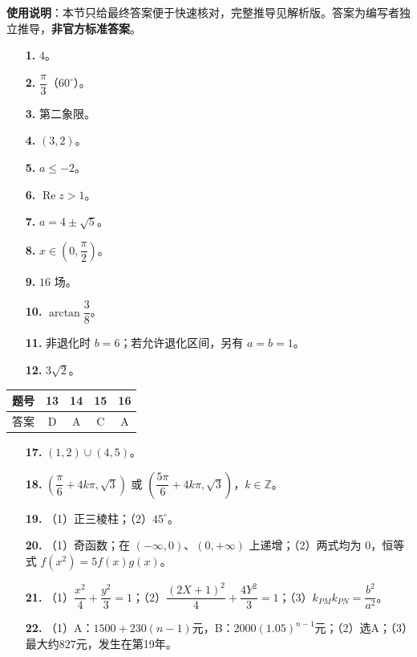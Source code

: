 
\begin{gknotice}
\textbf{使用说明}：本节只给最终答案便于快速核对，完整推导见解析版。答案为编写者独立推导，\textbf{非官方标准答案}。
\end{gknotice}

\begin{itemize}[leftmargin=2.6em]
  \item[\textbf{1.}] $4$。
  \item[\textbf{2.}] $\dfrac{\pi}{3}$（$60^\circ$）。
  \item[\textbf{3.}] 第二象限。
  \item[\textbf{4.}] $(3,2)$。
  \item[\textbf{5.}] $a\le -2$。
  \item[\textbf{6.}] $\operatorname{Re}z>1$。
  \item[\textbf{7.}] $a=4\pm\sqrt5$。
  \item[\textbf{8.}] $x\in(0,\dfrac{\pi}{2})$。
  \item[\textbf{9.}] $16$ 场。
  \item[\textbf{10.}] $\arctan\dfrac{3}{8}$。
  \item[\textbf{11.}] 非退化时 $b=6$；若允许退化区间，另有 $a=b=1$。
  \item[\textbf{12.}] $3\sqrt2$。
\end{itemize}

\begin{center}\begin{tabular}{ccccc}
\toprule
题号 & 13 & 14 & 15 & 16 \\
\midrule
答案 & D & A & C & A \\
\bottomrule
\end{tabular}\end{center}

\begin{itemize}[leftmargin=2.6em]
  \item[\textbf{17.}] $(1,2)\cup(4,5)$。
  \item[\textbf{18.}] $\left(\dfrac{\pi}{6}+4k\pi,\sqrt3\right)$ 或 $\left(\dfrac{5\pi}{6}+4k\pi,\sqrt3\right)$，$k\in\mathbb Z$。
  \item[\textbf{19.}] （1）正三棱柱；（2）$45^\circ$。
  \item[\textbf{20.}] （1）奇函数；在 $(-\infty,0)$、$(0,+\infty)$ 上递增；（2）两式均为 $0$，恒等式 $f(x^2)=5f(x)g(x)$。
  \item[\textbf{21.}] （1）$\dfrac{x^2}{4}+\dfrac{y^2}{3}=1$；（2）$\dfrac{(2X+1)^2}{4}+\dfrac{4Y^2}{3}=1$；（3）$k_{PM}k_{PN}=\dfrac{b^2}{a^2}$。
  \item[\textbf{22.}] （1）A：$1500+230(n-1)$元，B：$2000(1.05)^{n-1}$元；（2）选A；（3）最大约$827$元，发生在第19年。
\end{itemize}
